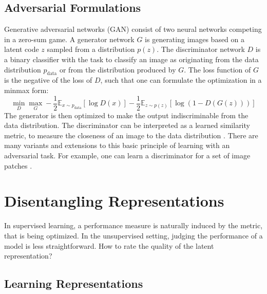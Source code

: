 	\subsection{Adversarial Formulations}\label{sec:adversarial}
		{Generative adversarial networks} (GAN) \cite{goodfellow14gan} consist of two neural networks competing in a zero-sum game. A generator network $G$ is generating images based on a latent code $z$ sampled from a distribution $p(z)$. The discriminator network $D$ is a binary classifier with the task to classify an image as originating from the data distribution $p_{\mathrm{data}}$ or from the distribution produced by $G$. The loss function of $G$ is the negative of the loss of $D$, such that one can formulate the optimization in a minmax form:
		\begin{equation}
			\min_D \max_G - \frac{1}{2} \mathds{E}_{x \sim p_{\mathrm{data}}} [\log D(x)] - \frac{1}{2} \mathds{E}_{z\sim p(z)}[\log (1-D(G(z)))]
		\end{equation}
		The generator is then optimized to make the output indiscriminable from the data distribution.
		The discriminator can be interpreted as a learned similarity metric, to measure the closeness of an image to the data distribution \cite{larsen15vaegan}.
		There are many variants and extensions to this basic principle of learning with an adversarial task. For example, one can learn a discriminator for a set of image patches \cite{isola17image2image}. 

\section{Disentangling Representations}\label{sec:disentangled}
	In supervised learning, a performance measure is naturally induced by the metric, that is being optimized. In the unsupervised setting, judging the performance of a model is less straightforward.
	How to rate the quality of the latent representation?

	\subsection{Learning Representations}

